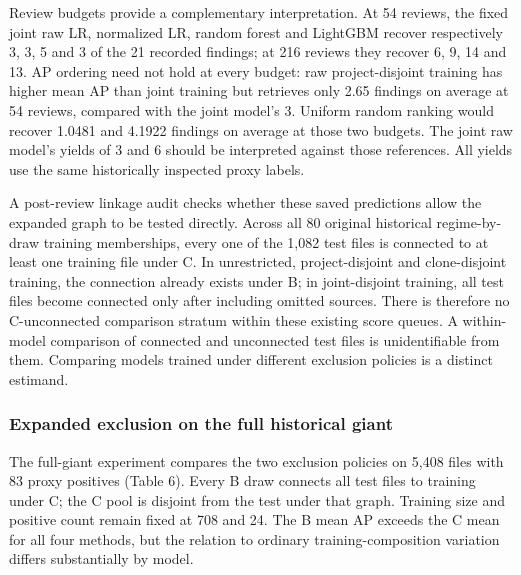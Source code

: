 \documentclass[preprint,12pt]{elsarticle}
\begin{document}
Review budgets provide a complementary interpretation. At 54 reviews, the fixed joint raw LR, normalized LR, random forest and LightGBM recover respectively 3, 3, 5 and 3 of the 21 recorded findings; at 216 reviews they recover 6, 9, 14 and 13. AP ordering need not hold at every budget: raw project-disjoint training has higher mean AP than joint training but retrieves only 2.65 findings on average at 54 reviews, compared with the joint model's 3. Uniform random ranking would recover 1.0481 and 4.1922 findings on average at those two budgets. The joint raw model's yields of 3 and 6 should be interpreted against those references. All yields use the same historically inspected proxy labels.

A post-review linkage audit checks whether these saved predictions allow the expanded graph to be tested directly. Across all 80 original historical regime-by-draw training memberships, every one of the 1,082 test files is connected to at least one training file under C. In unrestricted, project-disjoint and clone-disjoint training, the connection already exists under B; in joint-disjoint training, all test files become connected only after including omitted sources. There is therefore no C-unconnected comparison stratum within these existing score queues. A within-model comparison of connected and unconnected test files is unidentifiable from them. Comparing models trained under different exclusion policies is a distinct estimand.

\subsubsection{Expanded exclusion on the full historical giant}\label{expanded-exclusion-on-the-full-historical-giant}

The full-giant experiment compares the two exclusion policies on 5,408 files with 83 proxy positives (Table 6). Every B draw connects all test files to training under C; the C pool is disjoint from the test under that graph. Training size and positive count remain fixed at 708 and 24. The B mean AP exceeds the C mean for all four methods, but the relation to ordinary training-composition variation differs substantially by model.
\end{document}
